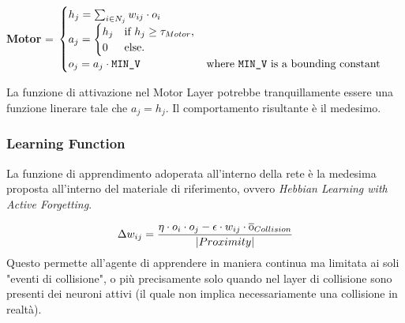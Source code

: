 \hfill\break

\textbf{Motor} = $
    \begin{cases}
        h_j = \sum_{i\in N_j} w_{ij}\cdot o_i & \\
        a_j = \begin{cases}
           h_j & \text{if $h_j \ge \tau_{Motor}$,}\\
           0 & \text{else.}
        \end{cases} & \\
        o_j = a_j \cdot \texttt{MIN\_V} & \text{where \texttt{MIN\_V} is a bounding constant} \\
    \end{cases}
$\\

\hfill\break

La funzione di attivazione nel Motor Layer potrebbe tranquillamente essere una funzione linerare tale che $a_j=h_j$. Il comportamento risultante è il medesimo.

\newpage

\subsubsection{Learning Function}

La funzione di apprendimento adoperata all'interno della rete è la medesima proposta all'interno del materiale di riferimento, ovvero \textit{Hebbian Learning with Active Forgetting}.

$$\Delta{w_{ij}}=\frac{\eta \cdot o_i \cdot o_j - \epsilon \cdot w_{ij} \cdot \overline{\rm o}_{Collision}}{|Proximity|}$$
\hfill\break
Questo permette all'agente di apprendere in maniera continua ma limitata ai soli "eventi di collisione", o più precisamente solo quando nel layer di collisione sono presenti dei neuroni attivi (il quale non implica necessariamente una collisione in realtà).